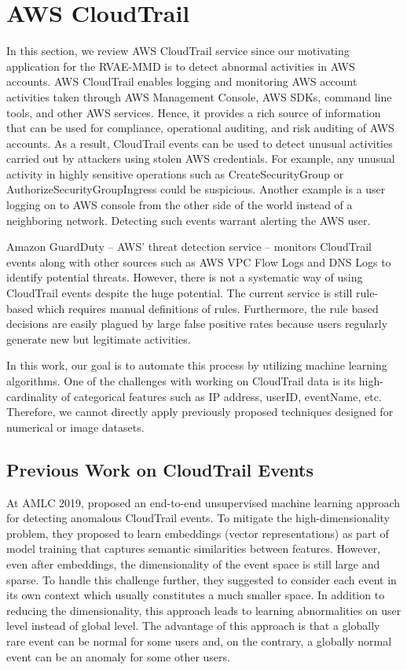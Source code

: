 \documentclass{article}
\theoremstyle{plain}
\theoremstyle{definition}
\begin{document}
\section{AWS CloudTrail}
In this section, we review AWS CloudTrail \cite{aws_cloudtrail} service since our motivating application for the RVAE-MMD is to detect abnormal activities in AWS accounts. AWS CloudTrail enables logging and monitoring AWS account activities taken through AWS Management Console, AWS SDKs, command line tools, and other AWS services. Hence, it provides a rich source of information that can be used for compliance, operational auditing, and risk auditing of AWS accounts. As a result, CloudTrail events can be used to detect unusual activities carried out by attackers using stolen AWS credentials. For example, any unusual activity in highly sensitive operations such as CreateSecurityGroup or AuthorizeSecurityGroupIngress could be suspicious. Another example is a user logging on to AWS console from the other side of the world instead of a neighboring network. Detecting such events warrant alerting the AWS user.

Amazon GuardDuty -- AWS' threat detection service \cite{aws_guardduty} -- monitors CloudTrail events along with other sources such as AWS VPC Flow Logs and DNS Logs to identify potential threats. However, there is not a systematic way of using CloudTrail events despite the huge potential. The current service is still rule-based which requires manual definitions of rules. Furthermore, the rule based decisions are easily plagued by large false positive rates because users regularly generate new but legitimate activities.

In this work, our goal is to automate this process by utilizing machine learning algorithms. One of the challenges with working on CloudTrail data is its high-cardinality of categorical features such as IP address, userID, eventName, etc. Therefore, we cannot directly apply previously proposed techniques designed for numerical or image datasets. 

\subsection{Previous Work on CloudTrail Events}
At AMLC 2019, \citet{coskun2019detecting} proposed an end-to-end unsupervised machine learning approach for detecting anomalous CloudTrail events. To mitigate the high-dimensionality problem, they proposed to learn embeddings (vector representations) as part of model training that captures semantic similarities between features. However, even after embeddings, the dimensionality of the event space is still large and sparse. To handle this challenge further, they suggested to consider each event in its own context which usually constitutes a much smaller space. In addition to reducing the dimensionality, this approach leads to learning abnormalities on user level instead of global level. The advantage of this approach is that a globally rare event can be normal for some users and, on the contrary, a globally normal event can be an anomaly for some other users.
\end{document}
